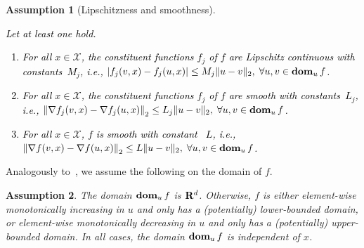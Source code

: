 \documentclass[12pt]{article}
\newcommand{\bnote}[1]{\textcolor{purple}{\textbf{[B: #1]}}}
\newcommand{\ie}{{\it i.e.}}
\newcommand{\reals}{{\bf R}}
\newcommand{\prob}{{\mathbf P}}
\newcommand{\dom}{\mathop{\bf dom}_u} %
\newcommand{\unc}{u}
\newtheorem{assumption}{Assumption}[section]
\newcommand{\RC}[1]{\textcolor{black}{#1}}
\newcommand{\RC}[1]{\textcolor{blue}{#1}}
\begin{document}
\begin{assumption}[Lipschitzness and smoothness]
\label{ass:general_ass_lip} \RC{Let at least one hold.
    \begin{enumerate}
        \item For all $x \in \mathcal{X}$, the constituent functions $f_j$ of $f$ are Lipschitz continuous with constants~$M_j$, \ie, $\left |f_j(v,x) - f_j(u,x)\right| \leq M_j\| u - v\|_2, \; \forall u,v \in \dom f$.
        \item For all $x \in \mathcal{X}$, the constituent functions $f_j$ of $f$ are smooth with constants~$L_j$, \ie, $\left\|\nabla f_j(v,x) - \nabla f_j(u,x)\right\|_2 \leq L_j\| u - v\|_2,\; \forall u,v \in \dom f$.
        \item For all $x \in \mathcal{X}$, $f$ is smooth with constant ~$L$, \ie, $\left\|\nabla f(v,x) - \nabla f(u,x)\right\|_2 \leq L\| u - v\|_2,\; \forall u,v \in \dom f$.
    \end{enumerate}}
\end{assumption}
Analogously to~\cite{mro}, we assume the following on the domain of $f$. 
\begin{assumption}
	\label{assp:dom}
	The domain $\dom{f}$ is $\reals^d$. Otherwise, $f$ is either element-wise monotonically increasing in $u$ and only has a (potentially) lower-bounded domain, or element-wise monotonically decreasing in $u$ and only has a (potentially) upper-bounded domain. In all cases, the domain $\dom{f}$ is independent of $x$.
\end{assumption}

\end{document}
